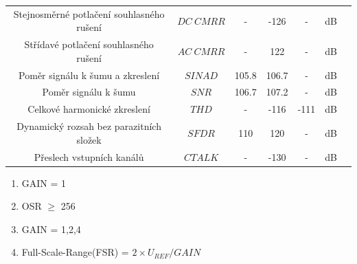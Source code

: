 \begin{table}[H]
\begin{ctucolortab}
\begin{tabular}{ccccccc}
            Stejnosměrné potlačení souhlasného rušení & $DC \ CMRR$                              & -                   & -126              & -                  & dB                                                & \\
            Střídavé potlačení souhlasného rušení     & $AC \ CMRR$                              & -                   & 122               & -                  & dB                                                & \\
            Poměr signálu k šumu a zkreslení          & $SINAD$                                  & 105.8               & 106.7             & -                  & dB                                                & \\
            Poměr signálu k šumu                      & $SNR$                                    & 106.7               & 107.2             & -                  & dB                                                & \\
            Celkové harmonické zkreslení              & $THD$                                    & -                   & -116              & -111               & dB                                                & \\
            Dynamický rozsah bez parazitních složek   & $SFDR$                                   & 110                 & 120               & -                  & dB                                                & \\
            Přeslech vstupních kanálů                 & $CTALK$                                  & -                   & -130              & -                  & dB                                                & \\
            \bottomrule
        \end{tabular}
    \end{ctucolortab}
    \begin{enumerate}
        \item GAIN = 1 \label{enum:mcp_gain_one}
        \item OSR $\geq$ 256 \label{enum:mcp_accuracy}
        \item GAIN = 1,2,4 \label{enum:mcp_drift}
        \item Full-Scale-Range(FSR) = $2 \times U_{REF}/GAIN$ \label{enum:mcp_adc_fsr}
    \end{enumerate}
\end{table}


